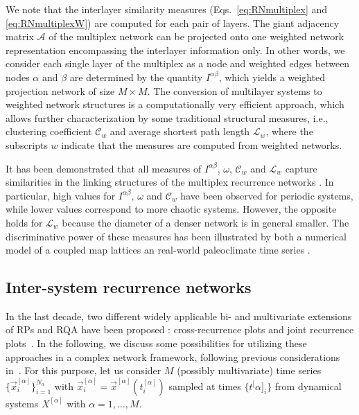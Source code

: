 		We note that the interlayer similarity measures (Eqs.~\ref{eq:RNmultiplex} and \ref{eq:RNmultiplexW}) are computed for each pair of layers. The giant adjacency matrix $\mathbf{\mathcal{A}}$ of the multiplex network can be projected onto one weighted network representation encompassing the interlayer information only. In other words, we consider each single layer of the multiplex as a node and weighted edges between nodes $\alpha$ and $\beta$ are determined by the quantity $I^{\alpha\beta}$, which yields a weighted projection network of size $M \times M$. The conversion of multilayer systems to weighted network structures is a computationally very efficient approach, which allows further characterization by some traditional structural measures, i.e., clustering coefficient  $\mathcal{C}_w$ and average shortest path length $\mathcal{L}_w$, where the subscripts $w$ indicate that the measures are computed from weighted networks.

		It has been demonstrated that all measures of $I^{\alpha\beta}$, $\omega$, $\mathcal{C}_w$ and $\mathcal{L}_w$ capture similarities in the linking structures of the multiplex recurrence networks \cite{Eroglu2018}. In particular, high values for $I^{\alpha\beta}$, $\omega$ and $\mathcal{C}_w$ have been observed for periodic systems, while lower values correspond to more chaotic systems. However, the opposite holds for $\mathcal{L}_w$ because the diameter of a denser network is in general smaller. The discriminative power of these measures has been illustrated by both a numerical model of a coupled map lattices an real-world paleoclimate time series \cite{Eroglu2018}.

	\subsection{Inter-system recurrence networks} \label{sec:IntSRN}
	In the last decade, two different widely applicable bi- and multivariate extensions of RPs and RQA have been proposed \cite{marwan2007}: cross-recurrence plots \cite{marwan2002,marwan2002pla,Zbilut1998} and joint recurrence plots~\cite{romano2004}. In the following, we discuss some possibilities for utilizing these approaches in a complex network framework, following previous considerations in~\cite{Feldhoff2011,Feldhoff2012,Feldhoff2013}. For this purpose, let us consider $M$ (possibly multivariate) time series $\{\vec{x}_i^{[\alpha]}\}_{i=1}^{N_\alpha}$ with $\vec{x}_i^{[\alpha]}=\vec{x}^{[\alpha]}(t^{[\alpha]}_i)$ sampled at times $\{t^[{\alpha]}_i\}$ from dynamical systems $X^{[\alpha]}$ with $\alpha=1,\dots,M$.

